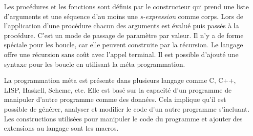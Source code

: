 Les procédures et les fonctions sont définis par le constructeur
 qui prend une liste d'arguments et une séquence d'au moins une
\textit{s-expression} comme corps. Lors de l'application d'une procédure chacun
des arguments est évalué puis passés à la procédure. C'est un mode de passage
de paramètre par valeur. Il n'y a de forme spéciale pour les boucle, car elle
peuvent construite par la récursion. Le langage offre une récursion sans coût
avec l'appel terminal.  Il est possible d'ajouté une syntaxe pour les boucle en
utilisant la méta programmation.






La programmation méta est présente dans plusieurs langage comme C, C++, LISP,
Haskell, Scheme, etc. Elle est basé sur la capacité d'un programme de manipuler
d'autre programme comme des données. Cela implique qu'il est possible de
générer, analyser et modifier le code d'un autre programme s'incluant.  Les
constructions utilisées pour manipuler le code du programme et
ajouter des extensions au langage sont les macros.

